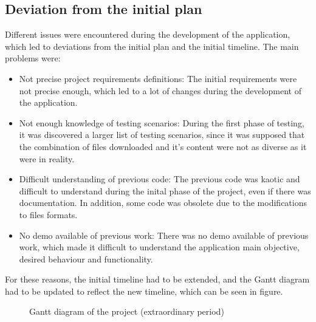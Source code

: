 \subsection{Deviation from the initial plan}
{Different issues were encountered during the development of the application, which led to deviations from the initial plan and the initial timeline. The main problems were:}
\begin{itemize}
    \item Not precise project requirements definitions: The initial requirements were not precise enough, which led to a lot of changes during the development of the application.
    \item Not enough knowledge of testing scenarios: During the first phase of testing, it was discovered a larger list of testing scenarios, since it was supposed that the combination of files downloaded and it's content were not as diverse as it were in reality.
    \item Difficult understanding of previous code: The previous code was kaotic and difficult to understand during the inital phase of the project, even if there was documentation. In addition, some code was obsolete due to the modifications to files formats.
    \item No demo available of previous work: There was no demo available of previous work, which made it difficult to understand the application main objective, desired behaviour and functionality.
\end{itemize} 
For these reasons, the initial timeline had to be extended, and the Gantt diagram had to be updated to reflect the new timeline, which can be seen in figure.
\label{ssec:gantt2}
\begin{figure}[H]
    \centering
    
    \caption[Project's Gantt diagram (extraordinary period)]{\footnotesize{Gantt diagram of the project (extraordinary period)}}
    \label{fig:gantt2}
\end{figure}